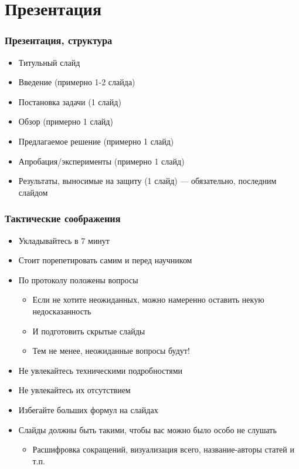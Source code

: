 \documentclass[xetex,mathserif,serif]{beamer}
\begin{document}
    \section{Презентация}

    \begin{frame}
        \frametitle{Презентация, структура}
        \begin{itemize}
            \item Титульный слайд
            \item Введение (примерно 1-2 слайда)
            \item Постановка задачи (1 слайд)
            \item Обзор (примерно 1 слайд)
            \item Предлагаемое решение (примерно 1 слайд)
            \item Апробация/эксперименты (примерно 1 слайд)
            \item Результаты, выносимые на защиту (1 слайд) --- обязательно, последним слайдом
        \end{itemize}
    \end{frame}

    \begin{frame}
        \frametitle{Тактические соображения}
        \begin{itemize}
            \item Укладывайтесь в 7 минут
            \item Стоит порепетировать самим и перед научником
            \item По протоколу положены вопросы
            \begin{itemize}
                \item Если не хотите неожиданных, можно намеренно оставить некую недосказанность
                \item И подготовить скрытые слайды
                \item Тем не менее, неожиданные вопросы будут!
            \end{itemize}
            \item Не увлекайтесь техническими подробностями
            \item Не увлекайтесь их отсутствием
            \item Избегайте больших формул на слайдах
            \item Слайды должны быть такими, чтобы вас можно было особо не слушать
            \begin{itemize}
                \item Расшифровка сокращений, визуализация всего, название-авторы статей и т.п.
            \end{itemize}
        \end{itemize}
    \end{frame}
\end{document}
